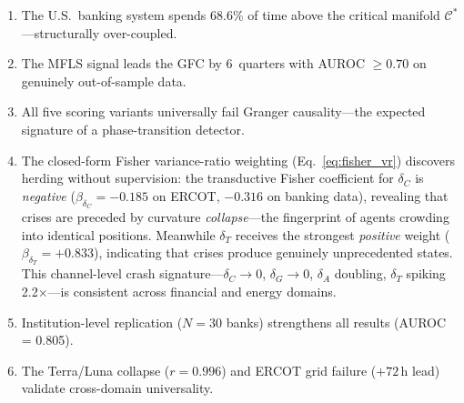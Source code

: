 \documentclass[final]{siamltex}
\newcommand{\Cman}{\mathcal{C}^*}
\begin{document}
\begin{enumerate}
\item The U.S.\ banking system spends 68.6\% of time above the
  critical manifold $\Cman$---structurally over-coupled.

\item The MFLS signal leads the GFC by 6~quarters with
  AUROC $\ge 0.70$ on genuinely out-of-sample data.

\item All five scoring variants universally fail Granger
  causality---the expected signature of a phase-transition detector.

\item The closed-form Fisher variance-ratio weighting
  (Eq.~\ref{eq:fisher_vr}) discovers herding without supervision:
  the transductive Fisher coefficient for $\delta_C$ is
  \emph{negative} ($\beta_{\delta_C}=-0.185$ on ERCOT,
  $-0.316$ on banking data), revealing that crises are preceded by
  curvature \emph{collapse}---the fingerprint of agents crowding
  into identical positions.  Meanwhile $\delta_T$ receives the
  strongest \emph{positive} weight ($\beta_{\delta_T}=+0.833$),
  indicating that crises produce genuinely unprecedented states.
  This channel-level crash signature---$\delta_C\to 0$,
  $\delta_G\to 0$, $\delta_A$ doubling, $\delta_T$ spiking
  2.2$\times$---is consistent across financial and energy domains.

\item Institution-level replication ($N=30$ banks) strengthens all
  results (AUROC = 0.805).

\item The Terra/Luna collapse ($r=0.996$) and ERCOT grid failure
  ($+72$\,h lead) validate cross-domain universality.


\end{enumerate}
\end{document}
